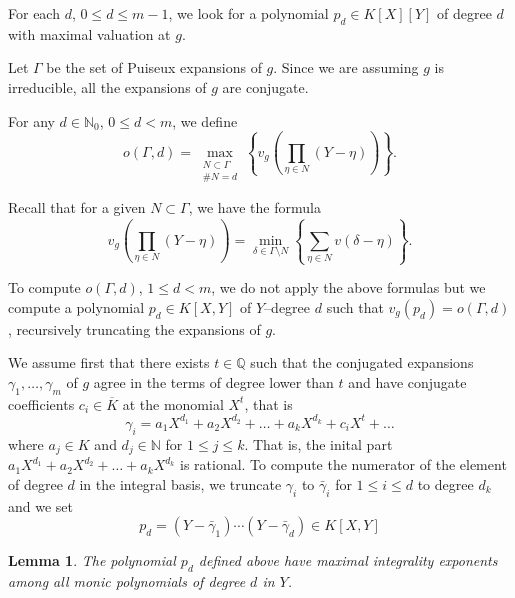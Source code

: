 \documentclass[a4paper,11pt]{amsart}%
\theoremstyle{definition}
\theoremstyle{plain}
\newtheorem{lemma}[defn]{Lemma}
\theoremstyle{remark}
\begin{document}
For each $d$, $0 \leq d \leq m-1$, we look for a polynomial $p_d \in K[X][Y]$ of degree $d$ with maximal valuation
at $g$. 

Let $\varGamma$ be the set of Puiseux expansions of $g$. Since we are assuming $g$ is irreducible, all the expansions of $g$ are conjugate. 


For any $d\in{\mathbb{N}}_{0}$, $0 \leq d < m$, we define
\[
o(\varGamma, d)=
\max_{\substack{N\subset\varGamma \\\#N = d}}\left\{v_{g}\left(  \prod_{\eta\in N}(Y-\eta)\right)  \right\}.
\]

Recall that for a given $N \subset\varGamma$, we have the formula
\[
v_{g}\left(  \prod_{\eta\in N}(Y - \eta)\right)  = \min_{\delta
\in\varGamma\setminus N} \left\{  \sum_{\eta\in N} v(\delta- \eta)\right\}  .
\]

To compute $o(\varGamma,d)$, $1 \leq d < m$, we do not apply the above
formulas but we compute a polynomial $p_d \in K[X,Y]$ of $Y$--degree $d$ such
that $v_{g}(p_d)=o(\varGamma,d)$, recursively truncating the expansions of $g$. 

We assume first that there exists $t\in\mathbb{Q}$ such that the conjugated expansions $\gamma_{1},\dots,\gamma_{m}$ of $g$ 
agree in the terms of degree lower than $t$ and have conjugate coefficients
$c_{i}\in\overline{K}$ at the monomial $X^{t}$, that is%
\[
\gamma_{i}=a_{1}X^{d_{1}}+a_{2}X^{d_{2}}+\dots+a_{k}X^{d_{k}}+c_{i}X^{t}+\dots
\]
where $a_{j}\in K$ and $d_{j}\in{\mathbb{N}}$ for $1 \le j \le k$. That is, the inital part $a_{1}X^{d_{1}}+a_{2}X^{d_{2}}+\dots+a_{k}X^{d_{k}}$ is rational.
To compute the numerator of the element of degree $d$ in the integral basis, we truncate $\gamma_{i}$ to
$\bar{\gamma}_{i}$ for $1 \le i \le d$ to degree $d_{k}$ and we set%
\[
p_d=(Y-\bar{\gamma}_{1}) \cdots(Y-\bar{\gamma}_{d}) \in K[X,Y]
\]

\begin{lemma}
\label{lemma:onecharexp} The polynomial $p_d$ defined above have maximal integrality exponents among all monic polynomials of degree $d$ in $Y$.
\end{lemma}
\end{document}
